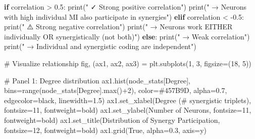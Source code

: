 \documentclass[
  11pt,
  letterpaper,
  oneside,
  openany]{book}
\newenvironment{Shaded}{\begin{snugshade}}{\end{snugshade}}
\newcommand{\BuiltInTok}[1]{\textcolor[rgb]{0.00,0.23,0.31}{#1}}
\newcommand{\CommentTok}[1]{\textcolor[rgb]{0.37,0.37,0.37}{#1}}
\newcommand{\ControlFlowTok}[1]{\textcolor[rgb]{0.00,0.23,0.31}{\textbf{#1}}}
\newcommand{\DecValTok}[1]{\textcolor[rgb]{0.68,0.00,0.00}{#1}}
\newcommand{\FloatTok}[1]{\textcolor[rgb]{0.68,0.00,0.00}{#1}}
\newcommand{\NormalTok}[1]{\textcolor[rgb]{0.00,0.23,0.31}{#1}}
\newcommand{\OperatorTok}[1]{\textcolor[rgb]{0.37,0.37,0.37}{#1}}
\newcommand{\StringTok}[1]{\textcolor[rgb]{0.13,0.47,0.30}{#1}}
\newcommand{\VariableTok}[1]{\textcolor[rgb]{0.07,0.07,0.07}{#1}}
\begin{document}
\begin{Shaded}
\begin{Highlighting}[]
\ControlFlowTok{if}\NormalTok{ correlation }\OperatorTok{\textgreater{}} \FloatTok{0.5}\NormalTok{:}
    \BuiltInTok{print}\NormalTok{(}\StringTok{"  ✓ Strong positive correlation"}\NormalTok{)}
    \BuiltInTok{print}\NormalTok{(}\StringTok{"  → Neurons with high individual MI also participate in synergies"}\NormalTok{)}
\ControlFlowTok{elif}\NormalTok{ correlation }\OperatorTok{\textless{}} \OperatorTok{{-}}\FloatTok{0.5}\NormalTok{:}
    \BuiltInTok{print}\NormalTok{(}\StringTok{"  ⚠️  Strong negative correlation"}\NormalTok{)}
    \BuiltInTok{print}\NormalTok{(}\StringTok{"  → Neurons work EITHER individually OR synergistically (not both)"}\NormalTok{)}
\ControlFlowTok{else}\NormalTok{:}
    \BuiltInTok{print}\NormalTok{(}\StringTok{"  → Weak correlation"}\NormalTok{)}
    \BuiltInTok{print}\NormalTok{(}\StringTok{"  → Individual and synergistic coding are independent"}\NormalTok{)}

\CommentTok{\# Visualize relationship}
\NormalTok{fig, (ax1, ax2, ax3) }\OperatorTok{=}\NormalTok{ plt.subplots(}\DecValTok{1}\NormalTok{, }\DecValTok{3}\NormalTok{, figsize}\OperatorTok{=}\NormalTok{(}\DecValTok{18}\NormalTok{, }\DecValTok{5}\NormalTok{))}

\CommentTok{\# Panel 1: Degree distribution}
\NormalTok{ax1.hist(node\_stats[}\StringTok{\textquotesingle{}Degree\textquotesingle{}}\NormalTok{], bins}\OperatorTok{=}\BuiltInTok{range}\NormalTok{(node\_stats[}\StringTok{\textquotesingle{}Degree\textquotesingle{}}\NormalTok{].}\BuiltInTok{max}\NormalTok{()}\OperatorTok{+}\DecValTok{2}\NormalTok{),}
\NormalTok{         color}\OperatorTok{=}\StringTok{\textquotesingle{}\#457B9D\textquotesingle{}}\NormalTok{, alpha}\OperatorTok{=}\FloatTok{0.7}\NormalTok{, edgecolor}\OperatorTok{=}\StringTok{\textquotesingle{}black\textquotesingle{}}\NormalTok{, linewidth}\OperatorTok{=}\FloatTok{1.5}\NormalTok{)}
\NormalTok{ax1.set\_xlabel(}\StringTok{\textquotesingle{}Degree (\# synergistic triplets)\textquotesingle{}}\NormalTok{, fontsize}\OperatorTok{=}\DecValTok{11}\NormalTok{, fontweight}\OperatorTok{=}\StringTok{\textquotesingle{}bold\textquotesingle{}}\NormalTok{)}
\NormalTok{ax1.set\_ylabel(}\StringTok{\textquotesingle{}Number of Neurons\textquotesingle{}}\NormalTok{, fontsize}\OperatorTok{=}\DecValTok{11}\NormalTok{, fontweight}\OperatorTok{=}\StringTok{\textquotesingle{}bold\textquotesingle{}}\NormalTok{)}
\NormalTok{ax1.set\_title(}\StringTok{\textquotesingle{}Distribution of Synergy Participation\textquotesingle{}}\NormalTok{, fontsize}\OperatorTok{=}\DecValTok{12}\NormalTok{, fontweight}\OperatorTok{=}\StringTok{\textquotesingle{}bold\textquotesingle{}}\NormalTok{)}
\NormalTok{ax1.grid(}\VariableTok{True}\NormalTok{, alpha}\OperatorTok{=}\FloatTok{0.3}\NormalTok{, axis}\OperatorTok{=}\StringTok{\textquotesingle{}y\textquotesingle{}}\NormalTok{)}


\end{Highlighting}
\end{Shaded}
\end{document}
